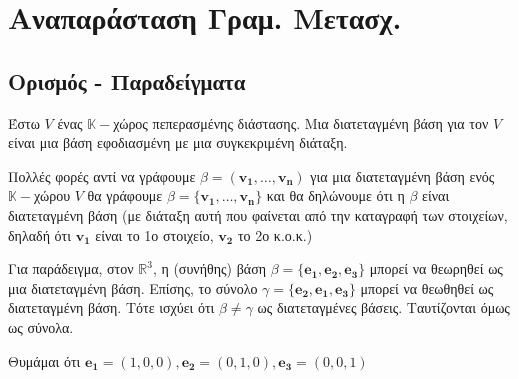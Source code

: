 



\pagestyle{vangelis}


\let\vec\mathbf
\DeclareMathOperator{\im}{Im}
\DeclareMathOperator{\Null}{null}
\DeclareMathOperator{\n}{null}
\DeclareMathOperator{\R}{Rank}
\pagestyle{vangelis}








\chapter{Αναπαράσταση Γραμ. Μετασχ.}

\section{Ορισμός - Παραδείγματα}

\begin{dfn}
  Έστω  $V$  ένας  $ \mathbb{K}- $χώρος πεπερασμένης διάστασης. Μια
  \textcolor{Col1}{διατεταγμένη βάση} για τον $V$ είναι μια βάση εφοδιασμένη με μια 
  συγκεκριμένη διάταξη.
\end{dfn}

\begin{rem}
  Πολλές φορές αντί να γράφουμε $ \beta = (\mathbf{v_{1}}, \ldots, \mathbf{v_{n}}) $ για 
  μια διατεταγμένη βάση ενός $ \mathbb{K}- $χώρου $V$ θα γράφουμε 
  $ \beta = \{ \mathbf{v_{1}}, \ldots, \mathbf{v_{n}} \} $ και θα δηλώνουμε ότι η 
  $ \beta $ είναι διατεταγμένη βάση (με διάταξη αυτή που φαίνεται από την καταγραφή 
  των στοιχείων, δηλαδή ότι $ \mathbf{v_{1}} $ είναι το 1ο στοιχείο, 
  $ \mathbf{v_{2}} $ το 2ο κ.ο.κ.) 
\end{rem}


\begin{example}
Για παράδειγμα, στον $ \mathbb{R}^{3} $, η (συνήθης) βάση $ \beta = \{ \mathbf{e_{1}}, 
\mathbf{e_{2}},\mathbf{e_{3}}\} $ μπορεί να θεωρηθεί ως μια διατεταγμένη βάση. 
Επίσης, το σύνολο $ \gamma = \{ \mathbf{e_{2}}, \mathbf{e_{1}}, \mathbf{e_{3}} \} $ 
μπορεί να θεωθηθεί ως διατεταγμένη βάση. 
Τότε ισχύει ότι $ \beta \neq \gamma $ ως διατεταγμένες βάσεις. 
Ταυτίζονται όμως ως σύνολα.  
\end{example}

\begin{rem}
  Θυμάμαι ότι $ \mathbf{e_{1}} = (1,0,0), \mathbf{e_{2}}=(0,1,0), 
  \mathbf{e_{3}}=(0,0,1) $ 
\end{rem}

